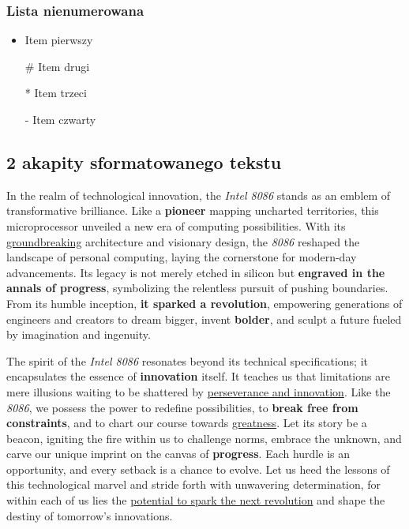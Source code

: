 \subsubsection{Lista nienumerowana}
\begin{itemize}
  \item Item pierwszy
  \item[\#] Item drugi
  \item[*] Item trzeci
  \item[-] Item czwarty
\end{itemize}

\subsection{2 akapity sformatowanego tekstu}


In the realm of technological innovation, the \textit{Intel 8086} stands as an emblem of transformative brilliance. Like a \textbf{pioneer} mapping uncharted territories, this microprocessor unveiled a new era of computing possibilities. With its \underline{groundbreaking} architecture and visionary design, the \textit{8086} reshaped the landscape of personal computing, laying the cornerstone for modern-day advancements. Its legacy is not merely etched in silicon but \textbf{engraved in the annals of progress}, symbolizing the relentless pursuit of pushing boundaries. From its humble inception, \textbf{it sparked a revolution}, empowering generations of engineers and creators to dream bigger, invent \textbf{bolder}, and sculpt a future fueled by imagination and ingenuity. \\


The spirit of the \textit{Intel 8086} resonates beyond its technical specifications; it encapsulates the essence of \textbf{innovation} itself. It teaches us that limitations are mere illusions waiting to be shattered by \underline{perseverance and innovation}. Like the \textit{8086}, we possess the power to redefine possibilities, to \textbf{break free from constraints}, and to chart our course towards \underline{greatness}. Let its story be a beacon, igniting the fire within us to challenge norms, embrace the unknown, and carve our unique imprint on the canvas of \textbf{progress}. Each hurdle is an opportunity, and every setback is a chance to evolve. Let us heed the lessons of this technological marvel and stride forth with unwavering determination, for within each of us lies the \underline{potential to spark the next revolution} and shape the destiny of tomorrow's innovations.